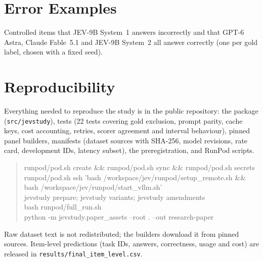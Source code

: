 \section{Error Examples}
\label{app:examples}
Controlled items that JEV-9B System~1 answers incorrectly and that GPT-6 Astra, Claude Fable~5.1 and JEV-9B System~2 all answer correctly (one per gold label, chosen with a fixed seed).


\section{Reproducibility}
\label{app:repro}
Everything needed to reproduce the study is in the public repository: the package (\texttt{src/jevstudy}), tests (22 tests covering gold exclusion, prompt parity, cache keys, cost accounting, retries, scorer agreement and interval behaviour), pinned panel builders, manifests (dataset sources with SHA-256, model revisions, rate card, development IDs, latency subset), the preregistration, and RunPod scripts.
\begin{quote}\footnotesize\ttfamily
runpod/pod.sh create \&\& runpod/pod.sh sync \&\& runpod/pod.sh secrets\\
runpod/pod.sh ssh 'bash /workspace/jev/runpod/setup\_remote.sh \&\& bash /workspace/jev/runpod/start\_vllm.sh'\\
jevstudy prepare; jevstudy variants; jevstudy amendments\\
bash runpod/full\_run.sh\\
python -m jevstudy.paper\_assets --root . --out research-paper
\end{quote}
Raw dataset text is not redistributed; the builders download it from pinned sources.
Item-level predictions (task IDs, answers, correctness, usage and cost) are released in \texttt{results/final\_item\_level.csv}.



